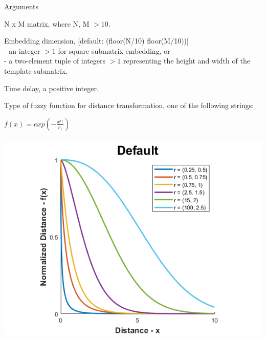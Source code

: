 \documentclass[12pt, a4paper, titlepage, openany]{book}
\begin{document}
\noindent \ul{Arguments}
\begin{description}[labelsep=1cm, labelwidth=2cm, nosep,,style=multiline,leftmargin=3cm]\footnotesize
\item[\texttt{Mat}]		N x M matrix,  where N, M $> 10$.
\item[\texttt{m}]		Embedding dimension, [default: (floor(N/10) floor(M/10))]\\
						- an integer $> 1$ for square submatrix embedding, or\\
						- a two-element tuple of integers $> 1$ representing the height and width of the template submatrix.
\item[\texttt{tau}]		Time delay, a positive integer.
\item[\texttt{Fx}]		Type of fuzzy function for distance transformation, one of the following strings:
	\begin{description}[labelsep=14em, labelwidth=10em, nosep,style=multiline,leftmargin=6cm]
	\item[\texttt{"default"}]	$f(x) = exp(-\frac{x^{r_2}}{r_1})$\\ \ \\
		\includegraphics[scale=.5]{Fuzz1v1.png} \\
		 

\end{description}
\end{description}
\end{document}
